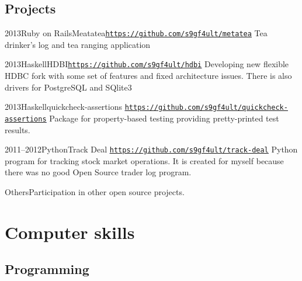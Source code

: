 \documentclass[11pt,a4paper,sans]{moderncv}        %
\newcommand*{\hlink}[1]{\textcolor{blue}{\texttt{\underline{\href{#1}{#1}}}}}
\begin{document}

\subsection{Projects}

\cventry
    {2013}{Ruby on Rails}{Meatatea}{\hlink{https://github.com/s9gf4ult/metatea}}{}
    {Tea drinker's log and tea ranging application}

\cventry
    {2013}{Haskell}{HDBI}{\hlink{https://github.com/s9gf4ult/hdbi}}{}
    {Developing new flexible HDBC fork with some set of features and fixed
      architecture issues. There is also drivers for PostgreSQL and SQlite3}

\cventry
    {2013}{Haskell}{quickcheck-assertions}%
    {\hlink{https://github.com/s9gf4ult/quickcheck-assertions}}{}{%
      Package for property-based testing providing pretty-printed test results.}

\cventry
    {2011--2012}{Python}{Track Deal}%
    {\hlink{https://github.com/s9gf4ult/track-deal}}{}
    {Python program for tracking stock market operations. It is created for
      myself because there was no good Open Source trader log program.}

\cvitem
    {Others}{Participation in other open source projects.}


\section{Computer skills}

\subsection{Programming}
\end{document}
